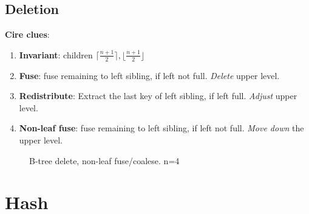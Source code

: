 \documentclass[a4paper]{report}
\begin{document}
\subsection{Deletion}
\textbf{Cire clues}:
\begin{enumerate}
\item \textbf{Invariant}: children $\lceil\frac{n+1}{2}\rceil, \lfloor\frac{n+1}{2}\rfloor$
\item \textbf{Fuse}: fuse remaining to left sibling, if left not full. \textit{Delete} upper level. 
\item \textbf{Redistribute}: Extract the last key of left sibling, if left full. \textit{Adjust} upper level.
\item \textbf{Non-leaf fuse}: fuse remaining to left sibling, if left not full. \textit{Move down} the upper level. 
\end{enumerate}
\begin{figure}[hbtp]
\centering
{}
\caption{B-tree delete, non-leaf fuse/coalese. n=4}
\label{fig:btreeDelete}
\end{figure}
\section{Hash}
\end{document}
